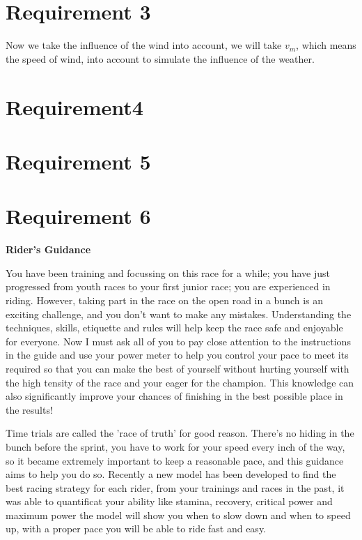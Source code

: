 \documentclass[12pt]{article}
\begin{document}
\section{Requirement 3}
Now we take the influence of the wind into account, we will take $v_m$, which means the speed of wind, into account to simulate the influence of the weather.
\section{Requirement4}


\section{Requirement 5}


\newpage
\section{Requirement 6}
\begin{center}
    \huge \textbf{Rider's Guidance}
\end{center}\large
You have been training and focussing on this race for a while; you  have just progressed from youth races to your first junior race; you are experienced in riding.
However, taking part in the race on the open road in a bunch is an exciting challenge, and you don't want to make any mistakes.
Understanding the techniques, skills, etiquette and rules will help keep the race safe and enjoyable for everyone. Now I must ask all of you to pay close attention to the instructions in the guide and use your power meter
to help you control your pace to meet its required so that you can make the best of yourself without hurting yourself with the high tensity of the race and your eager for
the champion. This knowledge can also significantly improve your chances of finishing in the best possible place in the results!

Time trials are called the 'race of truth' for good reason. There's no hiding in the bunch before the sprint, you have to work for your speed every inch of the way, so it
became extremely  important to keep a reasonable pace, and this guidance aims to help you do so.
Recently a new model has been developed to find the best racing strategy for each rider, from your trainings and races in the past, it was able to quantificat your ability
like stamina, recovery, critical power and maximum power the model will show you when to slow down and when to speed up, with a proper pace you will be able to ride
fast and easy.
\end{document}
